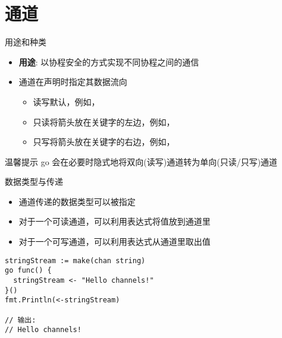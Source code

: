 \section{通道\channel }
\begin{frame}{用途和种类}
    \begin{itemize}
        \item \textbf{用途}: 以协程安全的方式实现不同协程之间的通信 
        \item 通道在声明时指定其数据流向
            \begin{itemize}
                \item \alert{读写}\quad 默认，例如，
                \item \alert{只读}\quad 将\code{<-}箭头放在关键字的左边，例如，
                \item \alert{只写}\quad 将\code{<-}箭头放在关键字的右边，例如，
            \end{itemize}
    \end{itemize}

    \pause
    \begin{exampleblock}{温馨提示}
        go 会在必要时隐式地将双向(读写)通道转为单向(只读/只写)通道 
    \end{exampleblock}
\end{frame}

\begin{frame}[fragile]{数据类型与传递}
    \begin{itemize}
        \item 通道传递的数据类型可以被指定
        \item 对于一个可读通道，可以利用表达式将值放到通道里
        \item 对于一个可写通道，可以利用表达式从通道里取出值
    \end{itemize}
\begin{lstlisting}[caption={通道数据传递样例}]
stringStream := make(chan string)
go func() {
  stringStream <- "Hello channels!"
}()
fmt.Println(<-stringStream)

// 输出:
// Hello channels!    
\end{lstlisting}    
\end{frame}

